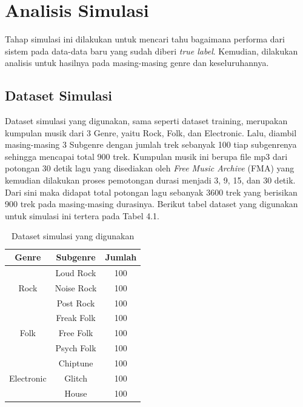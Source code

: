 \section{Analisis Simulasi}
\label{sec:analisissimulasi}

Tahap simulasi ini dilakukan untuk mencari tahu bagaimana performa dari sistem pada data-data baru yang sudah diberi \emph{true label}. Kemudian, dilakukan analisis untuk hasilnya pada masing-masing genre dan keseluruhannya.

\subsection{Dataset Simulasi}
\label{subsec:datasetsimulasi}

Dataset simulasi yang digunakan, sama seperti dataset training, merupakan kumpulan musik dari 3 Genre, yaitu Rock, Folk, dan Electronic. Lalu, diambil masing-masing 3 Subgenre dengan jumlah trek sebanyak 100 tiap subgenrenya sehingga mencapai total 900 trek. Kumpulan musik ini berupa file mp3 dari potongan 30 detik lagu yang disediakan oleh \emph{Free Music Archive} (FMA) \citep{DBLP:journals/corr/BenziDVB16} yang kemudian dilakukan proses pemotongan durasi menjadi 3, 9, 15, dan 30 detik. Dari sini maka didapat total potongan lagu sebanyak 3600 trek yang berisikan 900 trek pada masing-masing durasinya. Berikut tabel dataset yang digunakan untuk simulasi ini tertera pada Tabel 4.1.

\begin{longtable}[c]{|c|c|c|}
	\caption{Dataset simulasi yang digunakan}
	\label{tab:my-table}\\
	\hline
	\textbf{Genre}              & \textbf{Subgenre} & \textbf{Jumlah} \\ \hline
	\endfirsthead
	\endhead
	\multirow{3}{*}{Rock}       & Loud Rock         & 100             \\ \cline{2-3} 
	& Noise Rock        & 100             \\ \cline{2-3} 
	& Post Rock         & 100             \\ \hline
	\multirow{3}{*}{Folk}       & Freak Folk        & 100             \\ \cline{2-3} 
	& Free Folk         & 100             \\ \cline{2-3} 
	& Psych Folk        & 100             \\ \hline
	\multirow{3}{*}{Electronic} & Chiptune          & 100             \\ \cline{2-3} 
	& Glitch            & 100             \\ \cline{2-3} 
	& House             & 100             \\ \hline
\end{longtable}

